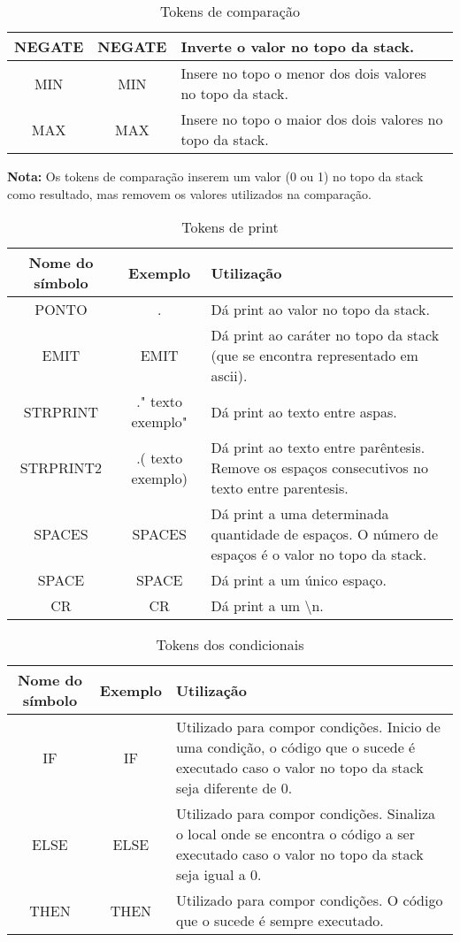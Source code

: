 \documentclass{article}
\begin{document}
\begin{table}[h]
\begin{tabular}{|c|c|p{6cm}|}
         NEGATE& NEGATE& Inverte o valor no topo da stack.\\ \hline 
         MIN& MIN& Insere no topo o menor dos dois valores no topo da stack.\\ \hline 
         MAX& MAX& Insere no topo o maior dos dois valores no topo da stack.\\ 
         \hline 
    \end{tabular}
    \caption{Tokens de comparação}
    \label{tab:arit}
    \textbf{Nota:} Os tokens de comparação inserem um valor (0 ou 1) no topo da stack como resultado, mas removem os valores utilizados na comparação. 
\end{table}

\begin{table}[h]
    \centering
    \begin{tabular}{|c|c|p{6cm}|}
         \hline
         \textbf{Nome do símbolo}& \textbf{Exemplo} &\textbf{Utilização}\\
         \hline
         PONTO& . & Dá print ao valor no topo da stack.\\ \hline
         EMIT& EMIT & Dá print ao caráter no topo da stack (que se encontra representado em ascii).\\ \hline
         STRPRINT& ." texto exemplo" & Dá print ao texto entre aspas.\\ \hline
         STRPRINT2& .( texto exemplo) & Dá print ao texto entre parêntesis. Remove os espaços consecutivos no texto entre parentesis.\\ \hline
         SPACES& SPACES & Dá print a uma determinada quantidade de espaços. O número de espaços é o valor no topo da stack.\\ \hline
         SPACE& SPACE & Dá print a um único espaço. \\ \hline
         CR & CR & Dá print a um \textbackslash n. \\
         \hline 
    \end{tabular}
    \caption{Tokens de print}
    \label{tab:arit} 
\end{table}

\begin{table}[h]
    \centering
    \begin{tabular}{|c|c|p{6cm}|}
         \hline
         \textbf{Nome do símbolo}& \textbf{Exemplo} &\textbf{Utilização}\\
         \hline
         IF& IF & Utilizado para compor condições. Inicio de uma condição, o código que o sucede é executado caso o valor no topo da stack seja diferente de 0.\\ \hline
         ELSE& ELSE & Utilizado para compor condições. Sinaliza o local onde se encontra o código a ser executado caso o valor no topo da stack seja igual a 0.\\ \hline
         THEN& THEN & Utilizado para compor condições. O código que o sucede é sempre executado.\\
         \hline 
    \end{tabular}
    \caption{Tokens dos condicionais}
    \label{tab:arit} 
\end{table}
\end{document}
